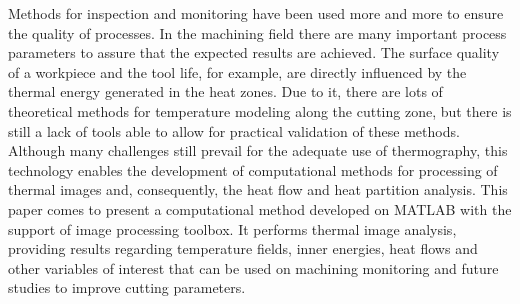 	Methods for inspection and monitoring have been used more and more to ensure the quality of processes. In the machining field there are many important process parameters to assure that the expected results are achieved. The surface quality of a workpiece and the tool life, for example, are directly influenced by the thermal energy generated in the heat zones. Due to it, there are lots of theoretical methods for temperature modeling along the cutting zone, but there is still a lack of tools able to allow for practical validation of these methods. Although many challenges still prevail for the adequate use of thermography, this technology enables the development of computational methods for processing of thermal images and, consequently, the heat flow and heat partition analysis.
	This paper comes to present a computational method developed on MATLAB with the support of image processing toolbox. It performs thermal image analysis, providing results regarding temperature fields, inner energies, heat flows and other variables of interest that can be used on machining monitoring and future studies to improve cutting parameters.